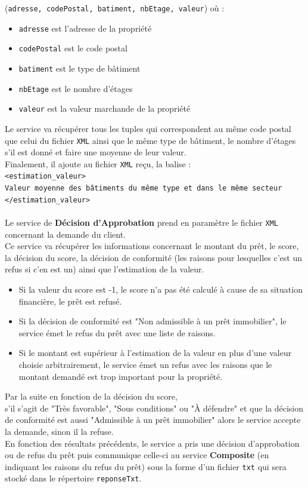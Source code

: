 \documentclass{article}
\begin{document}
	(\texttt{adresse, codePostal, batiment, nbEtage, valeur}) où : 
	\begin{itemize}
		\item \texttt{adresse} est l’adresse de la propriété
		\item \texttt{codePostal} est le code postal
		\item \texttt{batiment} est le type de bâtiment
		\item \texttt{nbEtage} est le nombre d’étages
		\item \texttt{valeur} est la valeur marchande de la propriété
	\end{itemize}
	Le service va récupérer tous les tuples qui correspondent au même code postal que celui du fichier \texttt{XML} ainsi que le même type de bâtiment, le nombre d’étages s’il est donné et faire une moyenne de leur valeur. \\
	Finalement, il ajoute au fichier \texttt{XML} reçu, la balise :\\
	\texttt{<estimation\_valeur> \\
	Valeur moyenne des bâtiments du même type et dans le même secteur\\
	</estimation\_valeur>}\\
	\\
	Le service  de \textbf{Décision d’Approbation} prend en paramètre le fichier \texttt{XML} concernant la demande du client. \\
	Ce service va récupérer les informations concernant le montant du prêt, le score, la décision du score, la décision de conformité (les raisons pour lesquelles c’est un refus si c'en est un) ainsi que l’estimation de la valeur. 
	\begin{itemize}
		\item Si la valeur du score est -1, le score n’a pas été calculé à cause de sa situation financière, le prêt est refusé.
		\item Si la décision de conformité est "Non admissible à un prêt immobilier", le service émet le refus du prêt avec une liste de raisons.
		\item Si le montant est supérieur à l’estimation de la valeur en plus d'une valeur choisie arbitrairement, le service émet un refus avec les raisons que le montant demandé est trop important pour la propriété.
	\end{itemize}
	
	Par la suite en fonction de la décision du score, \\
	s’il s’agit de "Très favorable", "Sous conditions" ou "À défendre" et que la décision de conformité est aussi "Admissible à un prêt immobilier" alors le service accepte la demande, sinon il la refuse.\\
	En fonction des résultats précédents, le service a pris une décision d'approbation ou de refus du prêt puis communique celle-ci au service \textbf{Composite} (en indiquant les raisons du refus du prêt) sous la forme d’un fichier \texttt{txt} qui sera stocké dans le répertoire \texttt{reponseTxt}.
	
\end{document}

